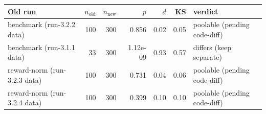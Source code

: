 \begin{tabular}{@{}>{\raggedright\arraybackslash}p{3.0cm} r r r r r >{\raggedright\arraybackslash}p{3.4cm}@{}}
\toprule
Old run & $n_{\mathrm{old}}$ & $n_{\mathrm{new}}$ & $p$ & $d$ & KS & verdict \\
\midrule
benchmark (run-3.2.2 data) & 100 & 300 & 0.856 & 0.02 & 0.05 & poolable (pending code-diff) \\
benchmark (run-3.1.1 data) & 33 & 300 & 1.12e-09 & 0.93 & 0.57 & differs (keep separate) \\
reward-norm (run-3.2.3 data) & 100 & 300 & 0.731 & 0.04 & 0.06 & poolable (pending code-diff) \\
reward-norm (run-3.2.4 data) & 100 & 300 & 0.399 & 0.10 & 0.10 & poolable (pending code-diff) \\
\bottomrule
\end{tabular}
